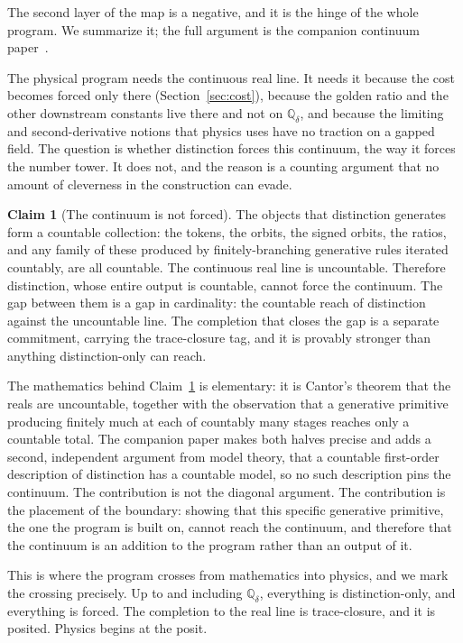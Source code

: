 \documentclass[11pt,a4paper]{article}
\theoremstyle{definition}
\newtheorem{claim}[theorem]{Claim}
\theoremstyle{remark}
\newcommand{\Qdelta}{\mathbb{Q}_{\delta}}
\begin{document}
The second layer of the map is a negative, and it is the hinge of the whole
program. We summarize it; the full argument is the companion continuum
paper~\cite{DeltaContinuum}.

The physical program needs the continuous real line. It needs it because the cost
becomes forced only there (Section~\ref{sec:cost}), because the golden ratio and
the other downstream constants live there and not on $\Qdelta$, and because the
limiting and second-derivative notions that physics uses have no traction on a
gapped field. The question is whether distinction forces this continuum, the way
it forces the number tower. It does not, and the reason is a counting argument
that no amount of cleverness in the construction can evade.

\begin{claim}[The continuum is not forced]\label{cl:cont}
The objects that distinction generates form a countable collection: the tokens,
the orbits, the signed orbits, the ratios, and any family of these produced by
finitely-branching generative rules iterated countably, are all countable. The
continuous real line is uncountable. Therefore distinction, whose entire output is
countable, cannot force the continuum. The gap between them is a gap in
cardinality: the countable reach of distinction against the uncountable line. The
completion that closes the gap is a separate commitment, carrying the
trace-closure tag, and it is provably stronger than anything distinction-only can
reach.
\end{claim}

The mathematics behind Claim~\ref{cl:cont} is elementary: it is Cantor's theorem
that the reals are uncountable, together with the observation that a generative
primitive producing finitely much at each of countably many stages reaches only a
countable total. The companion paper makes both halves precise and adds a second,
independent argument from model theory, that a countable first-order description of
distinction has a countable model, so no such description pins the continuum. The
contribution is not the diagonal argument. The contribution is the placement of
the boundary: showing that this specific generative primitive, the one the program
is built on, cannot reach the continuum, and therefore that the continuum is an
addition to the program rather than an output of it.

This is where the program crosses from mathematics into physics, and we mark the
crossing precisely. Up to and including $\Qdelta$, everything is
distinction-only, and everything is forced. The completion to the real line is
trace-closure, and it is posited. Physics begins at the posit.
\end{document}
